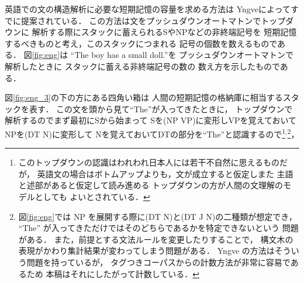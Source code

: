 英語での文の構造解析に必要な短期記憶の容量を求める方法は
Yngve\cite{yngve60}によってすでに提案されている．
この方法は文をプッシュダウンオートマトンでトップダウンに
解析する際にスタックに蓄えられるSやNPなどの非終端記号を
短期記憶するべきものと考え，このスタックにつまれる
記号の個数を数えるものである．
図\ref{fig:eng}は
``The boy has a small doll.''を
プッシュダウンオートマトンで解析したときに
スタックに蓄える非終端記号の数の
数え方を示したものである．
\begin{figure}[t]
\vspace{-5mm}

  \begin{center}

  \end{center}
\end{figure}
\begin{figure}[t]
\vspace{-1mm}
  \begin{center}
  \end{center}
\end{figure}
図\ref{fig:eng_3}の下の方にある四角い箱は
人間の短期記憶の格納庫に相当するスタックを表す．
この文を頭から見て``The''が入ってきたときに，
トップダウンで解析するのでまず最初にSから始まって
Sを(NP VP)に変形しVPを覚えておいてNPを(DT N)に変形して
Nを覚えておいてDTの部分を``The''と認識するので\footnote{
\baselineskip
このトップダウンの認識はわれわれ日本人には若干不自然に思えるものだが，
英語文の場合はボトムアップよりも，文が成立すると仮定しまた
主語と述部があると仮定して読み進める
トップダウンの方が人間の文理解のモデルとしても
よいとされている\cite{Kimball73}．}$^{,}$\footnote{
\baselineskip
図\ref{fig:eng}では
NP を展開する際に(DT N)と(DT J N)の二種類が想定でき，
``The'' が入ってきただけではそのどちらであるかを特定できないという
問題がある．
また，前提とする文法ルールを変更したりすることで，
構文木の表現がかわり集計結果が変わってしまう問題がある．
Yngve の方法はそういう問題を持っているが，
タグつきコーパスからの計数方法が非常に容易であるため
本稿はそれにしたがって計数している．}，
